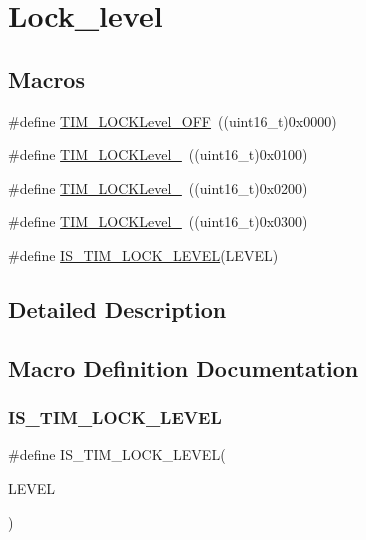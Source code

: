 \hypertarget{group___lock__level}{}\section{Lock\+\_\+level}
\label{group___lock__level}
\subsection*{Macros}
\begin{DoxyCompactItemize}
\item 
\#define \mbox{\hyperlink{group___lock__level_ga84d318c62d3e5dfe7082610d03e11f2f}{T\+I\+M\+\_\+\+L\+O\+C\+K\+Level\+\_\+\+O\+FF}}~((uint16\+\_\+t)0x0000)
\item 
\#define \mbox{\hyperlink{group___lock__level_ga7e4326fc7756ebf5e9eb9776c2734aea}{T\+I\+M\+\_\+\+L\+O\+C\+K\+Level\+\_}}~((uint16\+\_\+t)0x0100)
\item 
\#define \mbox{\hyperlink{group___lock__level_ga91bdf218f766e6a10b7a7df407250d25}{T\+I\+M\+\_\+\+L\+O\+C\+K\+Level\+\_}}~((uint16\+\_\+t)0x0200)
\item 
\#define \mbox{\hyperlink{group___lock__level_gaa0a0c1ffd9dc582d6571780c1747920b}{T\+I\+M\+\_\+\+L\+O\+C\+K\+Level\+\_}}~((uint16\+\_\+t)0x0300)
\item 
\#define \mbox{\hyperlink{group___lock__level_gacf5e70717f6d13af301331bb043f5d48}{I\+S\+\_\+\+T\+I\+M\+\_\+\+L\+O\+C\+K\+\_\+\+L\+E\+V\+EL}}(L\+E\+V\+EL)
\end{DoxyCompactItemize}


\subsection{Detailed Description}


\subsection{Macro Definition Documentation}
\mbox{\label{group___lock__level_gacf5e70717f6d13af301331bb043f5d48}} 
\subsubsection{\texorpdfstring{IS\_TIM\_LOCK\_LEVEL}{IS\_TIM\_LOCK\_LEVEL}}
{\footnotesize\ttfamily \#define I\+S\+\_\+\+T\+I\+M\+\_\+\+L\+O\+C\+K\+\_\+\+L\+E\+V\+EL(\begin{DoxyParamCaption}\item[{}]{L\+E\+V\+EL }\end{DoxyParamCaption})}

